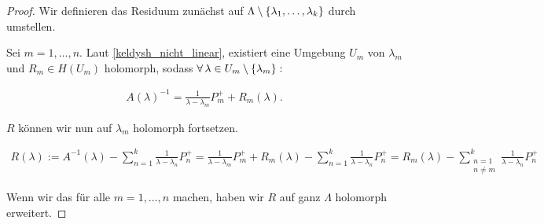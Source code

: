 \begin{proof}

    Wir definieren das Residuum zunächst auf $\Lambda \setminus {\left \{ \lambda_1, \dots, \lambda_k \right \}}$ durch umstellen.

    Sei $m = 1, \dots, n$.
    Laut \ref{keldysh_nicht_linear}, existiert eine Umgebung $U_m$ von $\lambda_m$ und $R_m \in H(U_m)$ holomorph, sodass $\forall \, \lambda \in U_m \setminus {\left \{ \lambda_m \right \}}:$

    \begin{align*}
        A(\lambda)^{-1}
        =
        \frac{1}{\lambda - \lambda_m} P_m^+
        +
        R_m(\lambda).
    \end{align*}

    $R$ können wir nun auf $\lambda_m$ holomorph fortsetzen.

    \begin{align*}
        R(\lambda)
        :=
        A^{-1}(\lambda)
        -
        \sum_{n=1}^k
            \frac{1}{\lambda - \lambda_n} P_n^+
        =
        \frac{1}{\lambda - \lambda_m} P_m^+
        +
        R_m(\lambda)
        -
        \sum_{n=1}^k
            \frac{1}{\lambda - \lambda_n} P_n^+
        =
        R_m(\lambda)
        -
        \sum_{\substack{n = 1 \\ n \neq m}}^k
            \frac{1}{\lambda - \lambda_n} P_n^+
    \end{align*}

    Wenn wir das für alle $m = 1, \dots, n$ machen, haben wir $R$ auf ganz $\Lambda$ holomorph erweitert.

\end{proof}